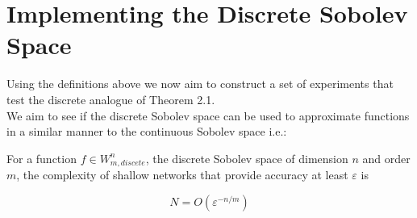 \documentclass{article}
\begin{document}
\section{Implementing the Discrete Sobolev Space}

Using the definitions above we now aim to construct a set of experiments that test the discrete analogue of Theorem 2.1.\\

We aim to see if the discrete Sobolev space can be used to approximate functions in a similar manner to the continuous Sobolev space i.e.:

For a function \(f \in W^{n}_{m, discete}\), the discrete Sobolev space of dimension \(n\) and order \(m\), the complexity of shallow networks that provide accuracy at least \( \varepsilon \) is

\[ N = O(\varepsilon^{-n/m}) \]
\end{document}
